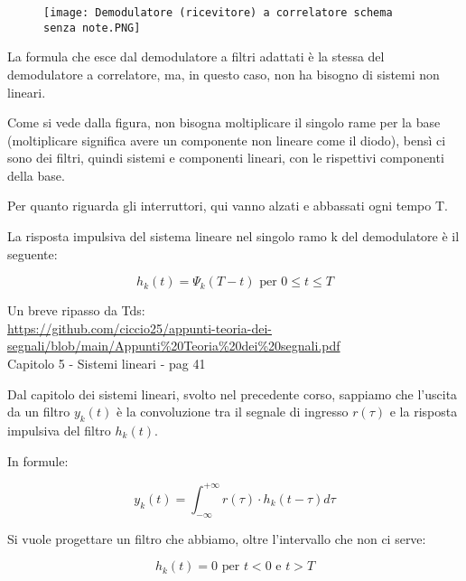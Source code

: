 \begin{figure}[h]
    \centering
    \texttt{[image: Demodulatore (ricevitore) a correlatore schema senza note.PNG]}
\end{figure}

La formula che esce dal demodulatore a filtri adattati è la stessa del demodulatore a correlatore, 
ma, in questo caso, non ha bisogno di sistemi non lineari. \newline 

Come si vede dalla figura, non bisogna moltiplicare il singolo rame per la base (moltiplicare significa avere un componente non lineare come il diodo), 
bensì ci sono dei filtri, quindi sistemi e componenti lineari, 
con le rispettivi componenti della base. \newline 

Per quanto riguarda gli interruttori, qui vanno alzati e abbassati ogni tempo T. \newline 

La risposta impulsiva del sistema lineare nel singolo ramo k del demodulatore è il seguente: 

{
    \Large 
    \begin{equation}
        h_k (t) = \Psi_k (T - t) \text{ per } 0 \le t \le T
    \end{equation}
}

\begin{tcolorbox}
    Un breve ripasso da Tds: \\
    \url{https://github.com/ciccio25/appunti-teoria-dei-segnali/blob/main/Appunti%20Teoria%20dei%20segnali.pdf} \\
    Capitolo 5 - Sistemi lineari - pag 41
\end{tcolorbox}

Dal capitolo dei sistemi lineari, svolto nel precedente corso, 
sappiamo che l'uscita da un filtro $y_k (t)$ è la convoluzione tra il segnale di ingresso $r(\tau)$ e la risposta impulsiva del filtro $h_k (t)$. \newline 

In formule: 

{
    \Large 
    \begin{equation}
        y_k (t)
        = 
        \int_{- \infty}^{+ \infty}
        r(\tau) \cdot h_k (t-\tau) d\tau
    \end{equation}
}

Si vuole progettare un filtro che abbiamo, oltre l'intervallo che non ci serve: 

{
    \Large 
    \begin{equation}
        h_k (t) = 0 \text{ per } t < 0 \text{ e } t > T
    \end{equation}
}

